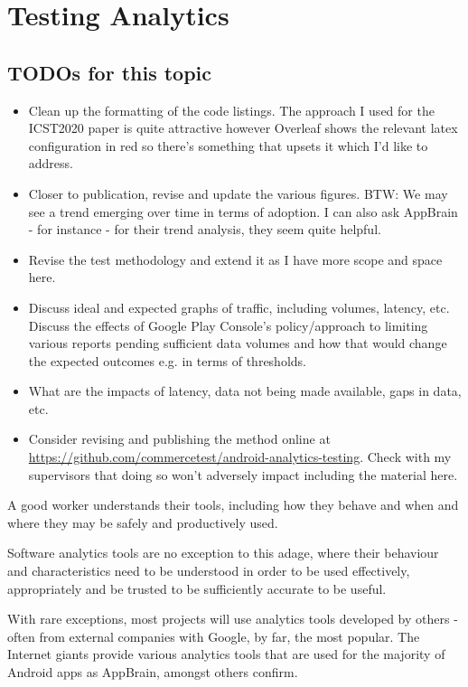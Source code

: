 \section{Testing Analytics}

\subsection{TODOs for this topic}
\begin{itemize}
    \item Clean up the formatting of the code listings. The approach I used for the ICST2020 paper is quite attractive however Overleaf shows the relevant latex configuration in red so there's something that upsets it which I'd like to address.
    \item Closer to publication, revise and update the various figures. BTW: We may see a trend emerging over time in terms of adoption. I can also ask AppBrain - for instance - for their trend analysis, they seem quite helpful.
    \item Revise the test methodology and extend it as I have more scope and space here.
    \item Discuss ideal and expected graphs of traffic, including volumes, latency, etc. Discuss the effects of Google Play Console's policy/approach to limiting various reports pending sufficient data volumes and how that would change the expected outcomes e.g. in terms of thresholds.
    \item What are the impacts of latency, data not being made available, gaps in data, etc. 
    \item Consider revising and publishing the method online at \url{https://github.com/commercetest/android-analytics-testing}. Check with my supervisors that doing so won't adversely impact including the material here.
\end{itemize}

A good worker understands their tools, including how they behave and when and where they may be safely and productively used.

Software analytics tools are no exception to this adage, where their behaviour and characteristics need to be understood in order to be used effectively, appropriately and be trusted to be sufficiently accurate to be useful.

With rare exceptions, most projects will use analytics tools developed by others - often from external companies with Google, by far, the most popular. The Internet giants provide various analytics tools that are used for the majority of Android apps as AppBrain, amongst others confirm. 

